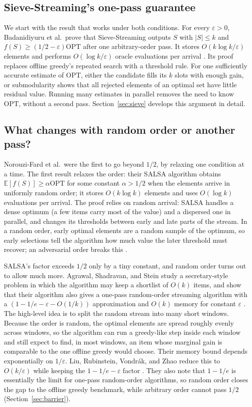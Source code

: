 \documentclass[10pt]{article}
\newcommand{\OPT}{\mathrm{OPT}}
\begin{document}
\subsection{Sieve-Streaming's one-pass guarantee}
We start with the result that works under both conditions. For every $\varepsilon>0$, Badanidiyuru et al.\ prove that Sieve-Streaming outputs $S$ with $|S|\leq k$ and $f(S)\geq(1/2-\varepsilon)\OPT$ after one arbitrary-order pass. It stores $O(k\log k/\varepsilon)$ elements and performs $O(\log k/\varepsilon)$ oracle evaluations per arrival \cite{badanidiyuru2014streaming}. Its proof replaces offline greedy's repeated search with a threshold rule. For one sufficiently accurate estimate of $\OPT$, either the candidate fills its $k$ slots with enough gain, or submodularity shows that all rejected elements of an optimal set have little residual value. Running many estimates in parallel removes the need to know $\OPT$, without a second pass. Section~\ref{sec:sieve} develops this argument in detail.

\subsection{What changes with random order or another pass?}
Norouzi-Fard et al.\ were the first to go beyond $1/2$, by relaxing one condition at a time. The first result relaxes the order: their SALSA algorithm obtains $\mathbb{E}[f(S)]\geq\alpha\OPT$ for some constant $\alpha>1/2$ when the elements arrive in uniformly random order; it stores $O(k\log k)$ elements and uses $O(\log k)$ evaluations per arrival. The proof relies on random arrival: SALSA handles a dense optimum (a few items carry most of the value) and a dispersed one in parallel, and changes its thresholds between early and late parts of the stream. In a random order, early optimal elements are a random sample of the optimum, so early selections tell the algorithm how much value the later threshold must recover; an adversarial order breaks this \cite{norouzifard2018beyond}.

SALSA's factor exceeds $1/2$ only by a tiny constant, and random order turns out to allow much more. Agrawal, Shadravan, and Stein study a secretary-style problem in which the algorithm may keep a shortlist of $O(k)$ items, and show that their algorithm also gives a one-pass random-order streaming algorithm with a $(1-1/e-\varepsilon-O(1/k))$ approximation and $O(k)$ memory for constant $\varepsilon$ \cite{agrawal2019shortlists}. The high-level idea is to split the random stream into many short windows. Because the order is random, the optimal elements are spread roughly evenly across windows, so the algorithm can run a greedy-like step inside each window and still expect to find, in most windows, an item whose marginal gain is comparable to the one offline greedy would choose. Their memory bound depends exponentially on $1/\varepsilon$. Liu, Rubinstein, Vondr\'ak, and Zhao reduce this to $O(k/\varepsilon)$ while keeping the $1-1/e-\varepsilon$ factor \cite{liu2021random}. They also note that $1-1/e$ is essentially the limit for one-pass random-order algorithms, so random order closes the gap to the offline greedy benchmark, while arbitrary order cannot pass $1/2$ (Section~\ref{sec:barrier}).
\end{document}
